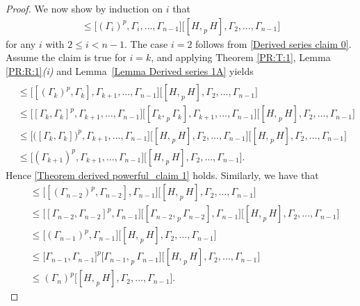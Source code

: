 \documentclass[12pt]{elsarticle}
\newtheorem*{main corollary*}{Main Corollary}
\theoremstyle{definition}
\begin{document}
\begin{proof}
      We now show by induction on $i$ that 
      \begin{align}
          [\Gamma_n, H]\leqslant \bigl[(\Gamma_i)^p,\Gamma_i,\ldots, \Gamma_{n-1}\bigr]\bigl[[H,_{\;p} H],\Gamma_2,\ldots, \Gamma_{n-1}\bigr] \label{Theorem derived powerful_claim 1}
      \end{align}
      for any $i$ with $2\leq i<n-1$. The case $i=2$ follows from \eqref{Derived series claim 0}. Assume the claim is true for $i=k$, and applying Theorem \ref{PR:T:1}, Lemma \ref{PR:R:1}\textit{(i)} and Lemma~\ref{Lemma Derived series 1A} yields
      \begin{align*}
         [&\Gamma_n, H]\\
         &\leqslant \bigl[[(\Gamma_k)^p,\Gamma_k],\Gamma_{k+1},\ldots, \Gamma_{n-1}\bigr]\bigl[[H,_{\;p} H],\Gamma_2,\ldots, \Gamma_{n-1}\bigr] \\
         &\leqslant  \bigl[[\Gamma_k,\Gamma_k]^p,\Gamma_{k+1},\ldots, \Gamma_{n-1}\bigr]\bigl[[\Gamma_k,_{\;p}\Gamma_k],\Gamma_{k+1},\ldots, \Gamma_{n-1}\bigr]\bigl[[H,_{\;p} H],\Gamma_2,\ldots, \Gamma_{n-1}\bigr]\\
         &\leqslant  \bigl[\big( [\Gamma_k,\Gamma_k]\big)^p,\Gamma_{k+1},\ldots, \Gamma_{n-1}\bigr] \bigl[[H,_{\;p} H],\Gamma_2,\ldots, \Gamma_{n-1}\bigr]\bigl[[H,_{\;p} H],\Gamma_2,\ldots, \Gamma_{n-1}\bigr]\\
         &\leqslant  \bigl[(\Gamma_{k+1})^p,\Gamma_{k+1},\ldots, \Gamma_{n-1}\bigr]\bigl[[H,_{\;p} H],\Gamma_2,\ldots, \Gamma_{n-1}\bigr].
      \end{align*}
        Hence \eqref{Theorem derived powerful_claim 1} holds. Similarly, we have that 
            \begin{align}
         [\Gamma_n, H]&\leqslant  \bigl[[(\Gamma_{n-2})^p,\Gamma_{n-2}],\Gamma_{n-1}\bigr]\bigl[[H,_{\;p} H],\Gamma_2,\ldots, \Gamma_{n-1}\bigr]  \nonumber\\
         &\leqslant  \bigl[[\Gamma_{n-2},\Gamma_{n-2}]^p,\Gamma_{n-1}\bigr]\bigl[[\Gamma_{n-2},_{\;p}\Gamma_{n-2}],\Gamma_{n-1}\bigr]\bigl[[H,_{\;p} H],\Gamma_2,\ldots, \Gamma_{n-1}\bigr]\nonumber\\
         &\leqslant  \bigl[(\Gamma_{n-1})^p,\Gamma_{n-1}\bigr]\bigl[[H,_{\;p} H],\Gamma_2,\ldots, \Gamma_{n-1}\bigr] \nonumber\\
         &\leqslant  \bigl[\Gamma_{n-1},\Gamma_{n-1}\bigr]^p\bigl[\Gamma_{n-1},_{\;p}\Gamma_{n-1}\bigr]\bigl[[H,_{\;p} H],\Gamma_2,\ldots, \Gamma_{n-1}\bigr]\nonumber\\
         &\leqslant  (\Gamma_n)^p\bigl[[H,_{\;p} H],\Gamma_2,\ldots, \Gamma_{n-1}\bigr] \label{Theorem derived powerful_claim 2}.

\end{align}
\end{proof}
\end{document}
